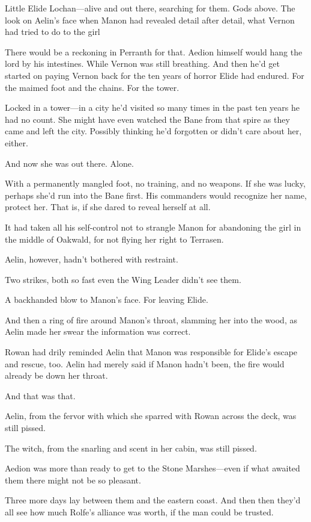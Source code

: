 Little Elide Lochan---alive and out there, searching for them. Gods above. The look on Aelin's face when Manon had revealed detail after detail, what Vernon had tried to do to the girl 

There would be a reckoning in Perranth for that. Aedion himself would hang the lord by his intestines. While Vernon was still breathing. And then he'd get started on paying Vernon back for the ten years of horror Elide had endured. For the maimed foot and the chains. For the tower.

Locked in a tower---in a city he'd visited so many times in the past ten years he had no count. She might have even watched the Bane from that spire as they came and left the city. Possibly thinking he'd forgotten or didn't care about her, either.

And now she was out there. Alone.

With a permanently mangled foot, no training, and no weapons. If she was lucky, perhaps she'd run into the Bane first. His commanders would recognize her name, protect her. That is, if she dared to reveal herself at all.

It had taken all his self-control not to strangle Manon for abandoning the girl in the middle of Oakwald, for not flying her right to Terrasen.

Aelin, however, hadn't bothered with restraint.

Two strikes, both so fast even the Wing Leader didn't see them.

A backhanded blow to Manon's face. For leaving Elide.

And then a ring of fire around Manon's throat, slamming her into the wood, as Aelin made her swear the information was correct.

Rowan had drily reminded Aelin that Manon was responsible for Elide's escape and rescue, too. Aelin had merely said if Manon hadn't been, the fire would already be down her throat.

And that was that.

Aelin, from the fervor with which she sparred with Rowan across the deck, was still pissed.

The witch, from the snarling and scent in her cabin, was still pissed.

Aedion was more than ready to get to the Stone Marshes---even if what awaited them there might not be so pleasant.

Three more days lay between them and the eastern coast. And then
 then they'd all see how much Rolfe's alliance was worth, if the man could be trusted.

